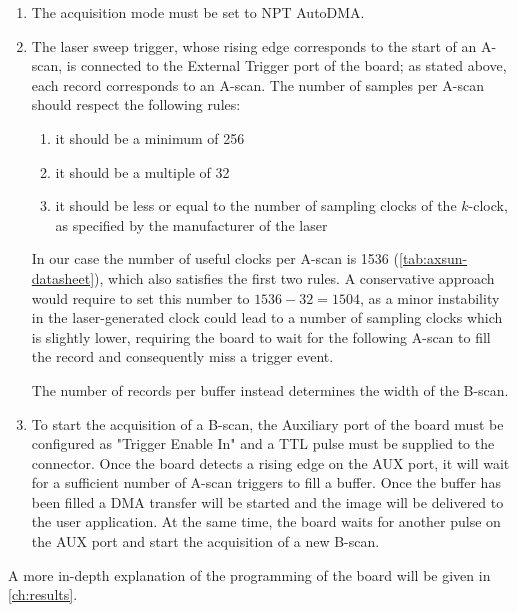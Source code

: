     \begin{enumerate}
    	
    	\item The acquisition mode must be set to NPT AutoDMA.
    	
    	\item The laser sweep trigger, whose rising edge corresponds to the start of an A-scan, is connected to the External Trigger port of the board; as stated above, each record corresponds to an A-scan. The number of samples per A-scan should respect the following rules:
    	\begin{enumerate}
    		\item it should be a minimum of 256
    		\item it should be a multiple of 32
    		\item it should be less or equal to the number of sampling clocks of the $k$-clock, as specified by the manufacturer of the laser
    	\end{enumerate}
    
    	In our case the number of useful clocks per A-scan is 1536 (\autoref{tab:axsun-datasheet}), which also satisfies the first two rules. A conservative approach would require to set this number to $1536-32 =1504$, as a minor instability in the laser-generated clock could lead to a number of sampling clocks which is slightly lower, requiring the board to wait for the following A-scan to fill the record and consequently miss a trigger event. 
    	
    	The number of records per buffer instead determines the width of the B-scan. 
    	
    	\item  To start the acquisition of a B-scan, the Auxiliary port of the board must be configured as "Trigger Enable In" and a TTL pulse must be supplied to the connector. Once the board detects a rising edge on the AUX port, it will wait for a sufficient number of A-scan triggers to fill a buffer. Once the buffer has been filled a DMA transfer will be started and the image will be delivered to the user application.
    	At the same time, the board waits for another pulse on the AUX port and start the acquisition of a new B-scan. 
    \end{enumerate}
    
    A more in-depth explanation of the programming of the board will be given in \autoref{ch:results}.
    

